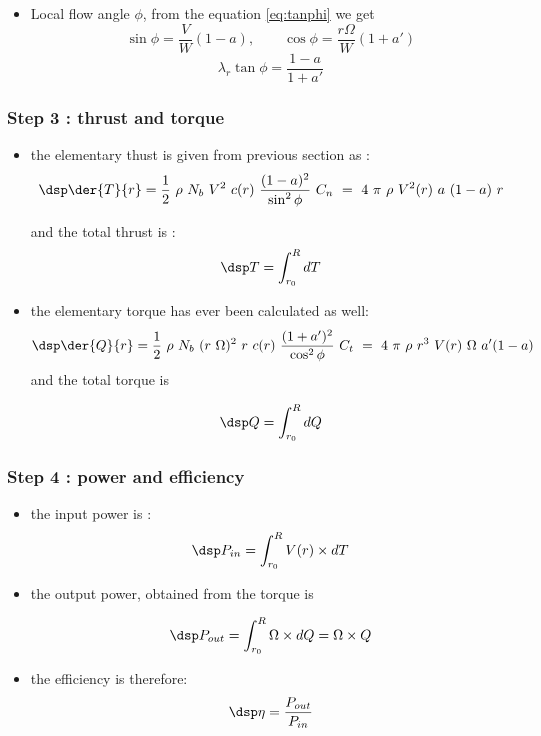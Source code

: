 \begin{itemize}
finally we find :


\begin{equation} \dsp 
  \dfrac{a'}{1+a'}  =   \dfrac{\sigma C_t}{4 \sin\phi \cos\phi} \qquad
  \Longrightarrow \qquad \dfrac{1}{a'} = \dfrac{4 \sin\phi \cos\phi}{\sigma C_t}-1 
\label{eq:ap}\end{equation}  

\item Local flow angle $\phi$, from the equation \eqref{eq:tanphi} we get
$$\sin\phi = \dfrac{V}{W} (1-a), \qquad  \cos\phi = \dfrac{r \Omega}{W} (1+a')
$$
\begin{equation}\lambda_r \tan \phi = \dfrac{1-a}{1+a'} \label{eq:lam}\end{equation}  

\end{itemize}

\subsubsection{\sc Step 3 : thrust and torque}

\begin{itemize}
\item the elementary thust is given from previous section as :
$$ \dsp
 \der{T}{r} =  \dfrac{1}{2}~\rho~N_b~V^2~c(r)~\dfrac{(1-a)^2}{\sin^2\phi}~C_n~=~
 4 \ \pi \ \rho \ V^2(r) \ a \ (1-a) \ r
$$

and the total  thrust is :
$$ \dsp
T  = \int_{r_0}^{R} dT
$$

\item the elementary torque has ever been calculated  as well:
$$\dsp
\der{Q}{r} =  \dfrac{1}{2}~\rho~N_b~(r~\Omega)^2~r~c(r)~\dfrac{(1+a')^2}{\cos^2\phi}~C_t~=~
 4~\pi~\rho~r^3~V(r)~\Omega~a'(1-a)
$$
and the total torque is 

$$ \dsp
Q  = \int_{r_0}^{R} dQ
$$
\end{itemize}



\subsubsection{\sc Step 4 : power and efficiency}

\begin{itemize}
\item the input power is :
$$ \dsp
P_{in}   = \int_{r_0}^{R} V(r) \times dT
$$

\item the output power, obtained from the torque is 
  

$$ \dsp
P_{out}  = \int_{r_0}^{R} \Omega\times dQ = \Omega \times Q 
$$
\item the efficiency is therefore:
$$\dsp
\eta = \frac{P_{out}}{P_{in}} 
$$
\end{itemize}


